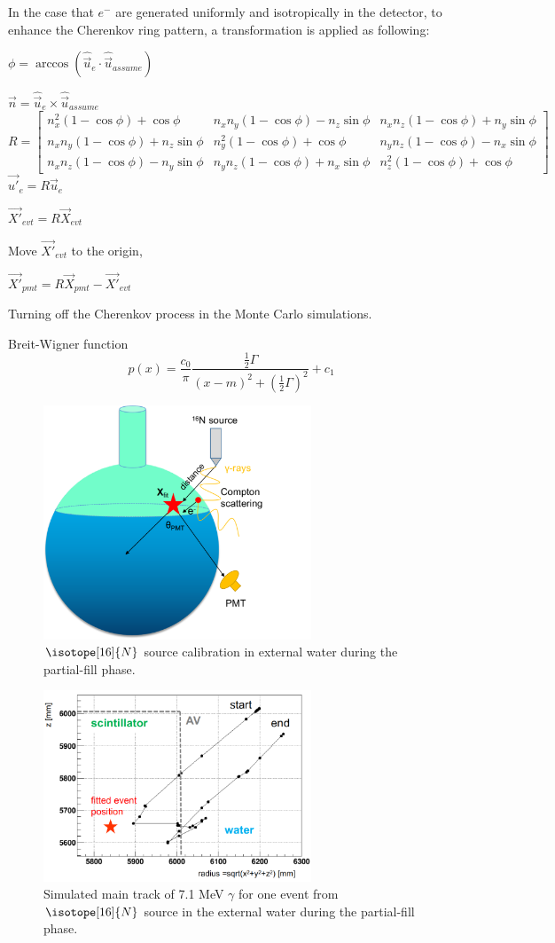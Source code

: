 In the case that $e^-$ are generated uniformly and isotropically in the detector, to enhance the 
Cherenkov ring pattern, a transformation is applied as following:

$\phi=\arccos(\hat{\vec{u}}_e\cdot\hat{\vec{u}}_{assume})$

$\vec{n}=\hat{\vec{u}}_e\times\hat{\vec{u}}_{assume}$
\[
R=\begin{bmatrix}
n^2_x(1-\cos\phi)+\cos\phi       &n_xn_y(1-\cos\phi)-n_z\sin\phi & n_xn_z(1-\cos\phi)+n_y\sin\phi \\
n_xn_y(1-\cos\phi)+n_z\sin\phi & n^2_y(1-\cos\phi)+\cos\phi & n_yn_z(1-\cos\phi)-n_x\sin\phi \\
n_xn_z(1-\cos\phi)-n_y\sin\phi & n_yn_z(1-\cos\phi)+n_x\sin\phi & n^2_z(1-\cos\phi)+\cos\phi
\end{bmatrix}
\]
$\vec{u'}_e=R\vec{u}_e$

$\vec{X'}_{evt}=R\vec{X}_{evt}$

Move $\vec{X'}_{evt}$ to the origin,

$\vec{X'}_{pmt}=R\vec{X}_{pmt}-\vec{X'}_{evt}$



Turning off the Cherenkov process in the Monte Carlo simulations.






Breit-Wigner function
\[
p(x) = \frac{c_0}{\pi}\frac{\frac{1}{2} \Gamma}{(x-m)^2 + (\frac{1}{2} \Gamma)^2}+c_1
\]

\begin{figure}[!htb]
	\centering
	\includegraphics[width=8cm]{partialN16.png}
	\caption{$\isotope[16]{N}$ source calibration in external water during the partial-fill phase.}
	\label{partialN16}
\end{figure}

\begin{figure}[!htb]
	\centering
	\includegraphics[width=8cm]{track_partial_N16.png}
	\caption{Simulated main track of 7.1 MeV $\gamma$ for one event from $\isotope[16]{N}$ source in the external water during the partial-fill phase.}	
	\label{track_partial_N16}
\end{figure}